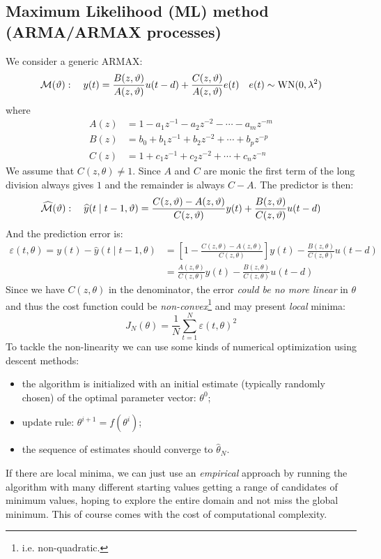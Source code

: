 
\subsection{Maximum Likelihood (ML) method (ARMA/ARMAX processes)}

We consider a generic ARMAX:
\[
	\mathcal{M}(\vartheta ): \quad y(t)=\frac{B(z,\vartheta )}{A(z,\vartheta)} u(t-d)+\frac{C(z,\vartheta )}{A(z,\vartheta)}e(t)\quad e(t)\sim \operatorname{WN}(0,\lambda^2)
\]
where
\begin{align*}
	A(z)&=1-a_{1} z^{-1}-a_{2} z^{-2}-\cdots-a_{m} z^{-m} \\
	B(z)&=b_{0}+b_{1} z^{-1}+b_{2} z^{-2}+\cdots+b_{p} z^{-p} \\
	C(z)&=1+c_{1} z^{-1}+c_{2} z^{-2}+\cdots+c_{n} z^{-n}
\end{align*}
We assume that $C(z,\theta)\neq 1$. Since $A$ and $C$ are monic the first term of the long division always gives $1$ and the remainder is always $C-A$. The predictor is then:
\[
	\widehat{\mathcal{M}}(\vartheta): \quad \widehat{y}(t \mid t-1, \vartheta)=\frac{C(z,\vartheta)-A(z,\vartheta)}{C(z,\vartheta)} y(t)+\frac{B(z,\vartheta)}{C(z,\vartheta)} u(t-d)
\]
And the prediction error is:
\begin{align*}
	\varepsilon(t, \theta)=y(t)-\hat{y}(t \mid t-1, \theta)&=\left[1-\frac{C(z,\theta)-A(z,\theta)}{C(z,\theta)}\right] y(t)-\frac{B(z,\theta)}{C(z,\theta)} u(t-d)\\
	&=\frac{A(z,\theta)}{C(z,\theta)} y(t)-\frac{B(z,\theta)}{C(z,\theta)} u(t-d)
\end{align*}
Since we have $C(z,\theta)$ in the denominator, the error \emph{could be no more linear} in $\theta$ and thus the cost function could be \emph{non-convex}\footnote{i.e. non-quadratic.} and may present \emph{local} minima:
\[
	J_{N}(\theta)=\frac{1}{N} \sum_{t=1}^{N} \varepsilon(t, \theta)^{2}
\]
To tackle the non-linearity we can use some kinds of numerical optimization using descent methods:
\begin{itemize}
	\item the algorithm is initialized with an initial estimate (typically randomly chosen) of the optimal parameter vector: $\theta^{0}$;
	\item update rule: $\theta^{i+1} = f (\theta^{i})$;
	\item the sequence of estimates should converge to $\hat\theta_{N}$.
\end{itemize}
If there are local minima, we can just use an \emph{empirical} approach by running the algorithm with many different starting values getting a range of candidates of minimum values, hoping to explore the entire domain and not miss the global minimum. This of course comes with the cost of computational complexity.


